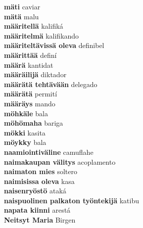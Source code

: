 \textbf{ mäti  } caviar \\
\textbf{ mätä  } malu \\
\textbf{ määritellä  } kalifiká \\
\textbf{ määritelmä  } kalifikando \\
\textbf{ määriteltävissä oleva  } definibel \\
\textbf{ määrittää  } definí \\
\textbf{ määrä  } kantidat \\
\textbf{ määräilijä  } diktador \\
\textbf{ määrätä tehtävään  } delegado \\
\textbf{ määrätä  } permití \\
\textbf{ määräys  } mando \\
\textbf{ möhkäle  } bala \\
\textbf{ möhömaha  } bariga \\
\textbf{ mökki  } kasita \\
\textbf{ möykky  } bala \\
\textbf{ naamiointiväline  } camuflahe \\
\textbf{ naimakaupan välitys  } acoplamento \\
\textbf{ naimaton mies  } soltero \\
\textbf{ naimisissa oleva  } kasa \\
\textbf{ naisenryöstö  } ataká \\
\textbf{ naispuolinen palkaton työntekijä  } katibu \\
\textbf{ napata kiinni  } arestá \\
\textbf{ Neitsyt Maria  } Birgen \\
